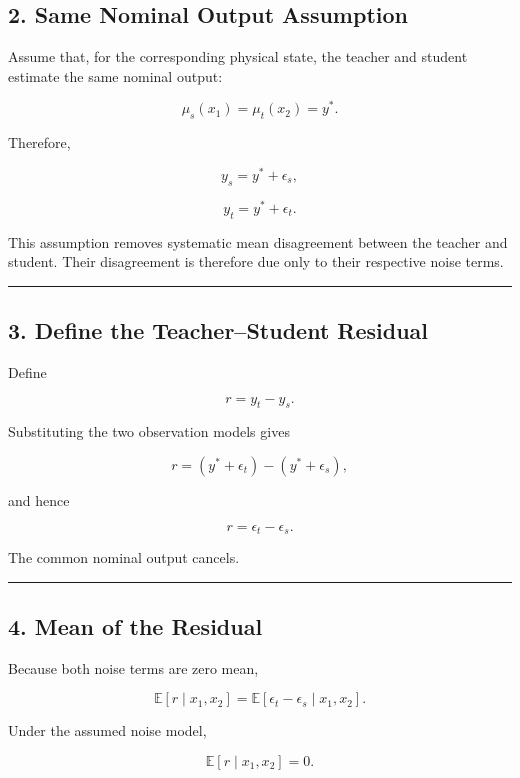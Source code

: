 \subsection{2. Same Nominal Output
Assumption}\label{same-nominal-output-assumption}

Assume that, for the corresponding physical state, the teacher and
student estimate the same nominal output:

\[
\mu_s(x_1)=\mu_t(x_2)=y^*.
\]

Therefore,

\[
y_s = y^*+\epsilon_s,
\]

\[
y_t = y^*+\epsilon_t.
\]

This assumption removes systematic mean disagreement between the teacher
and student. Their disagreement is therefore due only to their
respective noise terms.

\begin{center}\rule{0.5\linewidth}{0.5pt}\end{center}

\subsection{3. Define the Teacher--Student
Residual}\label{define-the-teacherstudent-residual}

Define

\[
r = y_t-y_s.
\]

Substituting the two observation models gives

\[
r
= (y^*+\epsilon_t)-(y^*+\epsilon_s),
\]

and hence

\[
\boxed{r=\epsilon_t-\epsilon_s.}
\]

The common nominal output cancels.

\begin{center}\rule{0.5\linewidth}{0.5pt}\end{center}

\subsection{4. Mean of the Residual}\label{mean-of-the-residual}

Because both noise terms are zero mean,

\[
\mathbb{E}[r\mid x_1,x_2]
=
\mathbb{E}[\epsilon_t-\epsilon_s\mid x_1,x_2].
\]

Under the assumed noise model,

\[
\boxed{\mathbb{E}[r\mid x_1,x_2]=0.}
\]

